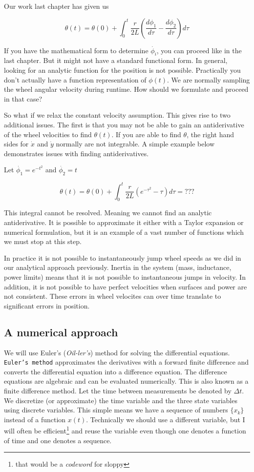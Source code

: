Our work last chapter has given us

\[\theta(t) = \theta(0) + \int_0^t \frac{r}{2L} \left(\frac{d\phi_1}{d\tau}-\frac{d\phi_2}{d\tau}\right)d\tau\]

If you have the mathematical form to determine \(\dot{\phi_i}\), you can
proceed like in the last chapter. But it might not have a standard
functional form. In general, looking for an analytic function for the
position is not possible. Practically you don't actually have a function
representation of \(\phi(t)\). We are normally sampling the wheel
angular velocity during runtime. How should we formulate and proceed in
that case?

So what if we relax the constant velocity assumption. This gives rise to
two additional issues. The first is that you may not be able to gain an
antiderivative of the wheel velocities to find \(\theta(t)\). If you are
able to find \(\theta\), the right hand sides for \(\dot{x}\) and
\(\dot{y}\) normally are not integrable. A simple example below
demonstrates issues with finding antiderivatives.

Let \(\dot{\phi_1} = e^{-t^2}\) and \(\dot{\phi_2} = t\)

\[\theta(t) = \theta(0) + \int_0^t \frac{r}{2L} \left(e^{-\tau^2}-\tau\right)d\tau = ???\]

This integral cannot be resolved. Meaning we cannot find an analytic
antiderivative. It is possible to approximate it either with a Taylor
expansion or numerical formulation, but it is an example of a vast
number of functions which we must stop at this step.

In practice it is not possible to instantaneously jump wheel speeds as
we did in our analytical approach previously. Inertia in the system
(mass, inductance, power limits) means that it is not possible to
instantaneous jumps in velocity. In addition, it is not possible to have
perfect velocities when surfaces and power are not consistent. These
errors in wheel velocites can over time translate to significant errors
in position.

\hypertarget{a-numerical-approach}{%
\subsection{A numerical approach}\label{a-numerical-approach}}

We will use Euler's (\emph{Oil-ler's}) method for solving the
differential equations. \texttt{Euler’s\ method} approximates the
derivatives with a forward finite difference and converts the
differential equation into a difference equation. The difference
equations are algebraic and can be evaluated numerically. This is also
known as a finite difference method. Let the time between measurements
be denoted by \(\Delta t\). We discretize (or approximate) the time
variable and the three state variables using discrete variables. This
simple means we have a sequence of numbers \(\{x_k\}\) instead of a
function \(x(t)\). Technically we should use a different variable, but I
will often be efficient\footnote{that would be a \emph{codeword} for
  sloppy} and reuse the variable even though one denotes a function of
time and one denotes a sequence.


